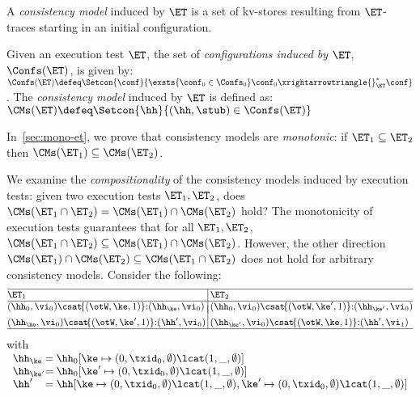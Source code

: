 A \emph{consistency model} induced by $\ET$ is a set of kv-stores
resulting from $\ET$-traces starting in an 
initial configuration. 

\begin{definition}
\label{def:cm}
Given an execution test $\ET$,  
the set of \emph{configurations induced by $\ET$},  $\Confs(\ET)$, is   given by: 
\(
\Confs(\ET)\defeq 
\Setcon{ \conf}{ 
	\exsts{\conf_0 \in \Confs_0}
	\conf_0 \xrightarrowtriangle{}_{\ET}^{*} \conf
}
\).
The \emph{consistency model} induced by $\ET$ is defined as:
\( 
\CMs(\ET) \defeq \Setcon{ \hh }{ (\hh, \stub) \in \Confs(\ET) }
\)
\end{definition}


\noindent In~\cref{sec:mono-et}, we prove that consistency models are 
\emph{monotonic}: 
if  $\ET_1 \subseteq \ET_2$ then $\CMs(\ET_1) \subseteq \CMs(\ET_2)$.

We examine the \emph{compositionality} of the consistency models induced by execution tests:  
\ie given two execution tests $\ET_1, \ET_2$, does 
$\CMs(\ET_1 \cap \ET_2) = \CMs(\ET_1) \cap \CMs(\ET_2)$ hold? 
The monotonicity of execution tests guarantees that 
 for all $\ET_1, \ET_2$, \( \CMs(\ET_1 \cap \ET_2) \subseteq \CMs(\ET_1) \cap \CMs(\ET_2) \). 
However, the other direction \( \CMs(\ET_1) \cap \CMs(\ET_2) \subseteq \CMs(\ET_1 \cap \ET_2) \) does not hold for arbitrary consistency models.
Consider the following:
\[
\small
\begin{array}{@{}l @{\hspace{2pt}} | @{\hspace{2pt}} l@{}}
    \hline
    \ET_1 & \ET_2 \\
%    
    \hline
    (\hh_{0}, \vi_{0}) \csat\! \{(\otW, \ke, 1)\} {:} ( \hh_{\ke}, \vi_{0})
    &
    (\hh_{0}, \vi_{0}) \csat\! \{(\otW, \ke', 1)\} {:} ( \hh_{\ke'}, \vi_{0}) 
    \vspace*{-7pt}\\\\
    (\hh_{\ke}, \vi_{0}) \csat  \!\{(\otW, \ke', 1)\} {:} (\hh',\vi_{0}) 
    &
    (\hh_{\ke'}, \vi_{0}) \csat \!\{(\otW, \ke, 1)\} {:} (\hh',\vi_{1}) 
    \\
\hline
\end{array}
\]%
with%
{\small
\(
\begin{array}[t]{l@{} l}
    \hh_{\ke} & = \hh_{0}[\ke \mapsto (0, \txid_{0}, \emptyset) \lcat (1, \_, \emptyset)] \\
    \hh_{\ke'} & = \hh_{0}[\ke' \mapsto (0, \txid_{0}, \emptyset) \lcat (1, \_, \emptyset)] \\
    \hh' & = \hh[\ke \mapsto (0, \txid_{0}, \emptyset) \lcat (1, \_, \emptyset) 
                ,\ke' \mapsto (0, \txid_{0}, \emptyset) \lcat (1, \_, \emptyset)] \\
\end{array}
\)%
}%

